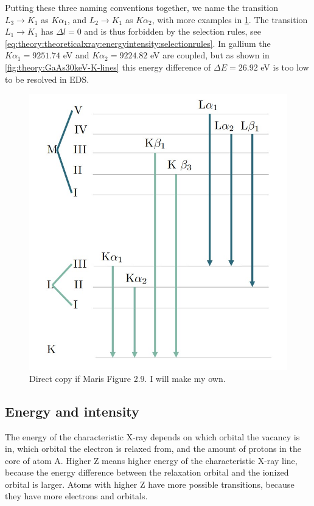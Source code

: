 Putting these three naming conventions together, we name the transition $L_3 \rightarrow K_1$ as $K\alpha_1$, and $L_2 \rightarrow K_1$ as $K\alpha_2$, with more examples in \cref{fig:theory:theoreticalxray:naming:lines}.
The transition $L_1 \rightarrow K_1$ has $\Delta l = 0$ and is thus forbidden by the selection rules, see \cref{eq:theory:theoreticalxray:energyintensity:selectionrules}.
In gallium the $K\alpha_1 = 9251.74$ eV and $K\alpha_2 = 9224.82$ eV \cite{thompson_x-ray_2004} are coupled, but as shown in \cref{fig:theory:GaAs30keV-K-lines} this energy difference of $\Delta E = 26.92$ eV is too low to be resolved in EDS.

\begin{figure}
    \centering
    \includegraphics[width=0.5\linewidth]{figures/mari2.9-naming-lines.jpg}
    \caption{Direct copy if Maris Figure 2.9. I will make my own.}
    \label{fig:theory:theoreticalxray:naming:lines}
\end{figure}



%
%
\subsection{Energy and intensity}
\label{sec:theory:theoreticalxray:energyintensity}

The energy of the characteristic X-ray depends on which orbital the vacancy is in, which orbital the electron is relaxed from, and the amount of protons in the core of atom A. %
Higher Z means higher energy of the characteristic X-ray line, because the energy difference between the relaxation orbital and the ionized orbital is larger.
Atoms with higher Z have more possible transitions, because they have more  electrons and orbitals.

